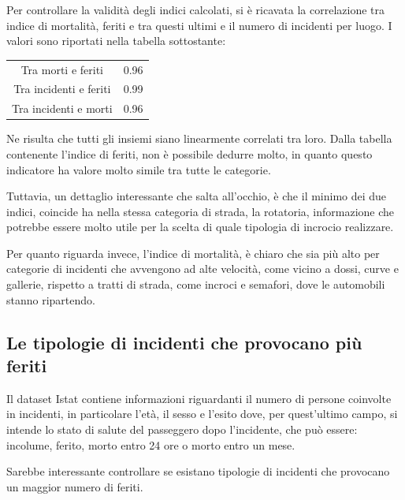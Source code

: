 \documentclass[a4paper,12pt]{report}
\begin{document}
Per controllare la validità degli indici calcolati, si è ricavata la correlazione 
tra indice di mortalità, feriti e tra questi ultimi e il numero di incidenti per 
luogo.
I valori sono riportati nella tabella sottostante: 

\begin{center}
    \def\arraystretch{1.5}%
    \begin{tabular}{ |c|c| }
        \hline
        \rowcolor{TableGray}
        Tra morti e feriti      & 0.96 \\ 
        Tra incidenti e feriti  & 0.99 \\
        \rowcolor{TableGray}
        Tra incidenti e morti   & 0.96 \\
        \hline
    \end{tabular}
\end{center}

Ne risulta che tutti gli insiemi siano linearmente correlati tra loro. 
Dalla tabella contenente l'indice di feriti, non è possibile dedurre molto, 
in quanto questo indicatore ha valore molto simile tra tutte le categorie. 

Tuttavia, un dettaglio interessante che salta all'occhio, è che il minimo dei due indici, 
coincide ha nella stessa categoria di strada, 
la rotatoria, informazione che potrebbe essere molto utile per 
la scelta di quale tipologia di incrocio realizzare.

Per quanto riguarda invece, l'indice di mortalità, è chiaro che sia più alto 
per categorie di incidenti che avvengono ad alte velocità, come vicino a dossi, 
curve e gallerie, rispetto a tratti di strada, come incroci e semafori, 
dove le automobili stanno ripartendo.

\subsection{Le tipologie di incidenti che provocano più feriti}

Il dataset Istat contiene informazioni riguardanti il numero di persone coinvolte 
in incidenti, in particolare l'età, il sesso e l'esito dove, 
per quest'ultimo campo, si intende lo stato di salute del passeggero 
dopo l'incidente, che può essere: incolume, ferito, morto entro 24 ore o morto entro un mese.

Sarebbe interessante controllare se esistano tipologie di incidenti che provocano 
un maggior numero di feriti.
\end{document}
